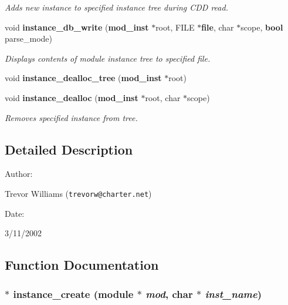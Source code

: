 \begin{CompactItemize}
\begin{CompactList}\small\item\em Adds new instance to specified instance tree during CDD read.\item\end{CompactList}\item 
void {\bf instance\_\-db\_\-write} ({\bf mod\_\-inst} $\ast$root, FILE $\ast${\bf file}, char $\ast$scope, {\bf bool} parse\_\-mode)
\begin{CompactList}\small\item\em Displays contents of module instance tree to specified file.\item\end{CompactList}\item 
void {\bf instance\_\-dealloc\_\-tree} ({\bf mod\_\-inst} $\ast$root)
\item 
void {\bf instance\_\-dealloc} ({\bf mod\_\-inst} $\ast$root, char $\ast$scope)
\begin{CompactList}\small\item\em Removes specified instance from tree.\item\end{CompactList}\end{CompactItemize}


\subsection{Detailed Description}


\begin{Desc}
\item[Author: ]\par
Trevor Williams ({\tt trevorw@charter.net}) \end{Desc}
\begin{Desc}
\item[Date: ]\par
3/11/2002\end{Desc}


\subsection{Function Documentation}
\subsubsection{$\ast$ instance\_\-create ({\bf module} $\ast$ {\em mod}, char $\ast$ {\em inst\_\-name})}\label{instance_8c_a0}


